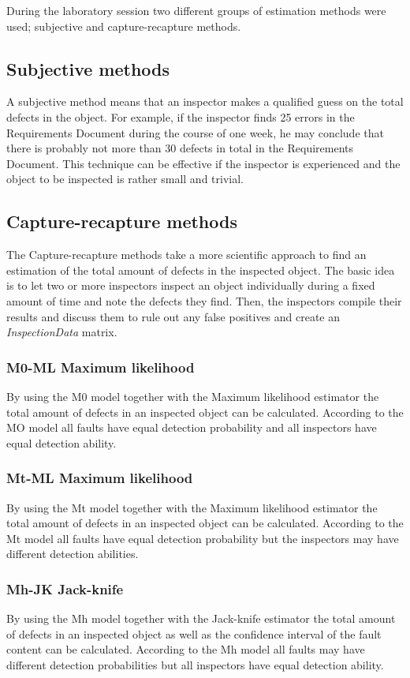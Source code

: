 During the laboratory session two different groups of estimation methods were used; subjective and capture-recapture methods. 

\subsection{Subjective methods}
A subjective method means that an inspector makes a qualified guess on the total defects in the object. For example, if the inspector finds 25 errors in the Requirements Document during the course of one week, he may conclude that there is probably not more than 30 defects in total in the Requirements Document. This technique can be effective if the inspector is experienced and the object to be inspected is rather small and trivial.

\subsection{Capture-recapture methods}
The Capture-recapture methods take a more scientific approach to find an estimation of the total amount of defects in the inspected object. The basic idea is to let two or more inspectors inspect an object individually during a fixed amount of time and note the defects they find. Then, the inspectors compile their results and discuss them to rule out any false positives and create an \textit{InspectionData} matrix.

\subsubsection{M0-ML Maximum likelihood}
By using the M0 model together with the Maximum likelihood estimator the total amount of defects in an inspected object can be calculated. 
According to the MO model all faults have equal detection probability and all inspectors have equal detection ability.

\subsubsection{Mt-ML Maximum likelihood}
By using the Mt model together with the Maximum likelihood estimator the total amount of defects in an inspected object can be calculated. 
According to the Mt model all faults have equal detection probability but the inspectors may have different detection abilities.

\subsubsection{Mh-JK Jack-knife}
By using the Mh model together with the Jack-knife estimator the total amount of defects in an inspected object as well as the confidence interval of the fault content can be calculated. 
According to the Mh model all faults may have different detection probabilities but all inspectors have equal detection ability.  
